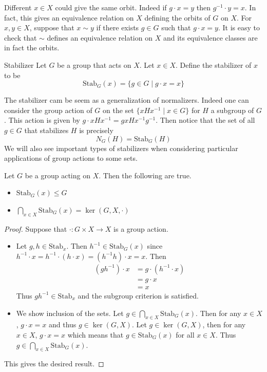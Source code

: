 \documentclass[a4paper]{article}
\begin{document}
Different $x\in X$ could give the same orbit. Indeed if $g\cdot x=y$ then $g^{-1}\cdot y=x$. In fact, this gives an equivalence relation on $X$ defining the orbits of $G$ on $X$. For $x,y\in X$, suppose that $x\sim y$ if there exists $g\in G$ such that $g\cdot x=y$. It is easy to check that $\sim$ defines an equivalence relation on $X$ and its equivalence classes are in fact the orbits. 

\begin{defn}{Stabilizer}{} Let $G$ be a group that acts on $X$. Let $x\in X$. Define the stabilizer of $x$ to be $$\text{Stab}_G(x)=\{g\in G\;|\;g\cdot x=x\}$$
\end{defn}

The stabilizer cam be seem as a generalization of normalizers. Indeed one can consider the group action of $G$ on the set $\{xHx^{-1}\;|\;x\in G\}$ for $H$ a subgroup of $G$. This action is given by $g\cdot xHx^{-1}=gxHx^{-1}g^{-1}$. Then notice that the set of all $g\in G$ that stabilizes $H$ is precisely $$N_G(H)=\text{Stab}_G(H)$$ We will also see important types of stabilizers when considering particular applications of group actions to some sets. 

\begin{prp}{}{} Let $G$ be a group acting on $X$. Then the following are true. 
\begin{itemize}
\item $\text{Stab}_G(x)\leq G$ 
\item $\bigcap_{x\in X}\text{Stab}_G(x)=\ker(G,X,\cdot)$
\end{itemize}\tcbline
\begin{proof} Suppose that $\cdot:G\times X\to X$ is a group action. 
\begin{itemize}
\item Let $g,h\in\text{Stab}_x$. Then $h^{-1}\in\text{Stab}_G(x)$ since $h^{-1}\cdot x=h^{-1}\cdot(h\cdot x)=(h^{-1}h)\cdot x=x$. Then
\begin{align*}
(gh^{-1})\cdot x&=g\cdot(h^{-1}\cdot x)\\
&=g\cdot x\\
&=x
\end{align*}
Thus $gh^{-1}\in\text{Stab}_x$ and the subgroup criterion is satisfied. 
\item We show inclusion of the sets. Let $g\in\bigcap_{x\in X}\text{Stab}_G(x)$. Then for any $x\in X$, $g\cdot x=x$ and thus $g\in\ker(G,X)$. Let $g\in\ker(G,X)$, then for any $x\in X$, $g\cdot x=x$ which means that $g\in\text{Stab}_G(x)$ for all $x\in X$. Thus $g\in\bigcap_{x\in X}\text{Stab}_G(x)$. 
\end{itemize}
This gives the desired result. 
\end{proof}
\end{prp}
\end{document}
